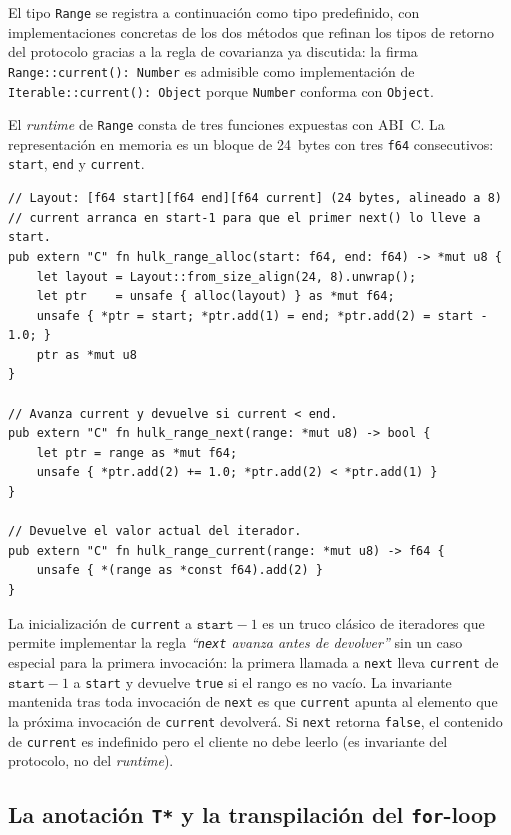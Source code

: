 \documentclass[11pt,a4paper,oneside,openany]{report}
\newcommand{\code}[1]{\texttt{#1}}
\begin{document}
El tipo \code{Range} se registra a continuación como tipo predefinido, con
implementaciones concretas de los dos métodos que refinan los tipos de
retorno del protocolo gracias a la regla de covarianza ya discutida: la
firma \code{Range::current(): Number} es admisible como implementación de
\code{Iterable::current(): Object} porque \code{Number} conforma con
\code{Object}.

El \textit{runtime} de \code{Range} consta de tres funciones expuestas con
ABI~C. La representación en memoria es un bloque de 24~bytes con tres
\code{f64} consecutivos: \code{start}, \code{end} y \code{current}.

\begin{lstlisting}[style=rustst, caption={Runtime del tipo \code{Range}.}, label={lst:rt-range}]
// Layout: [f64 start][f64 end][f64 current] (24 bytes, alineado a 8)
// current arranca en start-1 para que el primer next() lo lleve a start.
pub extern "C" fn hulk_range_alloc(start: f64, end: f64) -> *mut u8 {
    let layout = Layout::from_size_align(24, 8).unwrap();
    let ptr    = unsafe { alloc(layout) } as *mut f64;
    unsafe { *ptr = start; *ptr.add(1) = end; *ptr.add(2) = start - 1.0; }
    ptr as *mut u8
}

// Avanza current y devuelve si current < end.
pub extern "C" fn hulk_range_next(range: *mut u8) -> bool {
    let ptr = range as *mut f64;
    unsafe { *ptr.add(2) += 1.0; *ptr.add(2) < *ptr.add(1) }
}

// Devuelve el valor actual del iterador.
pub extern "C" fn hulk_range_current(range: *mut u8) -> f64 {
    unsafe { *(range as *const f64).add(2) }
}
\end{lstlisting}

La inicialización de \code{current} a $\code{start}-1$ es un truco clásico
de iteradores que permite implementar la regla \emph{``\code{next} avanza
antes de devolver''} sin un caso especial para la primera invocación: la
primera llamada a \code{next} lleva \code{current} de $\code{start}-1$ a
\code{start} y devuelve \code{true} si el rango es no vacío. La invariante
mantenida tras toda invocación de \code{next} es que \code{current} apunta
al elemento que la próxima invocación de \code{current} devolverá. Si
\code{next} retorna \code{false}, el contenido de \code{current} es
indefinido pero el cliente no debe leerlo (es invariante del protocolo, no
del \emph{runtime}).

\subsection{La anotación \code{T*} y la transpilación del \code{for}-loop}
\end{document}
